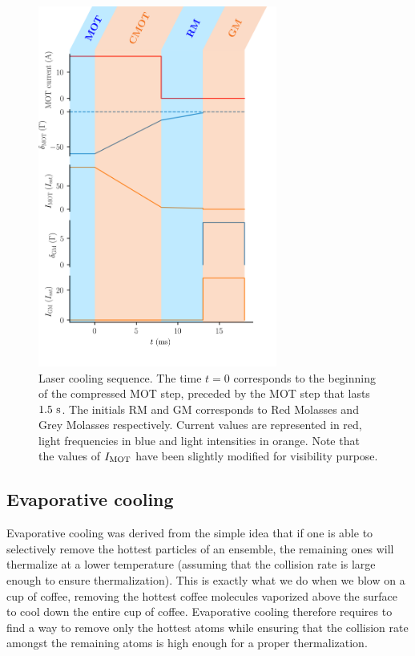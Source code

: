 \begin{figure}
    \centering
    \includegraphics[width=0.7\textwidth]{Fig/Chapter3/laser_cooling.png}
    \caption[Laser cooling sequence]{Laser cooling sequence. The time $t=0$ corresponds to the beginning of the compressed MOT step, preceded by the MOT step that lasts $1.5 \ \rm{s}$. The initials RM and GM corresponds to Red Molasses and Grey Molasses respectively. Current values are represented in red, light frequencies in blue and light intensities in orange. Note that the values of $I_{\rm{MOT}}$ have been slightly modified for visibility purpose.}
    \label{fig:my_label}
\end{figure}

\subsection{Evaporative cooling}

Evaporative cooling was derived from the simple idea that if one is able to selectively remove the hottest particles of an ensemble, the remaining ones will thermalize at a lower temperature (assuming that the collision rate is large enough to ensure thermalization). This is exactly what we do when we blow on a cup of coffee, removing the hottest coffee molecules vaporized above the surface to cool down the entire cup of coffee. Evaporative cooling therefore requires to find a way to remove only the hottest atoms while ensuring that the collision rate amongst the remaining atoms is high enough for a proper thermalization. 

